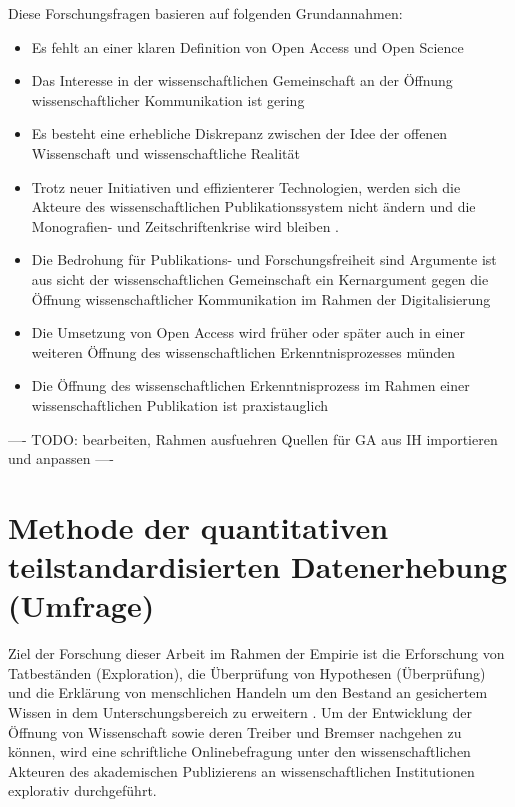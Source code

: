 Diese Forschungsfragen basieren auf folgenden Grundannahmen:
\begin{itemize}
\item Es fehlt an einer klaren Definition von Open Access und Open Science \cite{siehe_unten}
\item Das Interesse in der wissenschaftlichen Gemeinschaft an der Öffnung wissenschaftlicher Kommunikation ist gering \cite{hagner_2015_sache_buches}
\item Es besteht eine erhebliche Diskrepanz zwischen der Idee der offenen Wissenschaft und wissenschaftliche Realität \cite{Scheliga_2014}
\item Trotz neuer Initiativen und effizienterer Technologien, werden sich die Akteure des wissenschaftlichen Publikationssystem nicht ändern und die Monografien- und Zeitschriftenkrise wird bleiben \cite{Parks_2002_acadamic_faust}.
\item Die Bedrohung für Publikations- und Forschungsfreiheit sind Argumente ist aus sicht der wissenschaftlichen Gemeinschaft ein Kernargument gegen die Öffnung wissenschaftlicher Kommunikation im Rahmen der Digitalisierung \cite{siehe_unten}
\item Die Umsetzung von Open Access wird früher oder später auch in einer weiteren Öffnung des wissenschaftlichen Erkenntnisprozesses münden \cite{siehe_unten}
\item Die Öffnung des wissenschaftlichen Erkenntnisprozess im Rahmen einer wissenschaftlichen Publikation ist praxistauglich \cite{siehe_unten}
\end{itemize}

---- TODO: bearbeiten, Rahmen ausfuehren Quellen für GA aus IH importieren und anpassen ----

\section{Methode der quantitativen teilstandardisierten Datenerhebung (Umfrage)}

Ziel der Forschung dieser Arbeit im Rahmen der Empirie ist die Erforschung von Tatbeständen (Exploration), die Überprüfung von Hypothesen (Überprüfung) \cite{raab_2012_fragebogen} und die Erklärung von menschlichen Handeln \cite{suchen_Methoden_d_empirischen_Sozialforschung} um den Bestand an gesichertem Wissen in dem Unterschungsbereich zu erweitern \cite{bortz_Döring_2006_fragestellung}. Um der Entwicklung der Öffnung von Wissenschaft sowie deren Treiber und Bremser nachgehen zu können, wird eine schriftliche Onlinebefragung unter den wissenschaftlichen Akteuren des akademischen Publizierens an wissenschaftlichen Institutionen explorativ durchgeführt.

